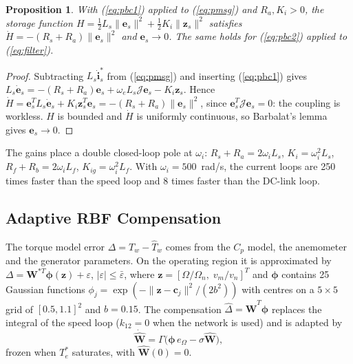 \documentclass[11pt,a4paper]{article}
\newtheorem{proposition}{Proposition}
\newcommand{\bv}[1]{\mathbf{#1}}
\newcommand{\Jm}{\boldsymbol{\mathcal{J}}}
\begin{document}
\begin{proposition}
With (\ref{eq:pbc1}) applied to (\ref{eq:pmsg}) and $R_a,K_i>0$, the storage function
$H=\frac12L_s\|\bv{e}_s\|^2+\frac12K_i\|\bv{z}_s\|^2$ satisfies $\dot H=-(R_s+R_a)\|\bv{e}_s\|^2$ and
$\bv{e}_s\to0$. The same holds for (\ref{eq:pbc2}) applied to (\ref{eq:filter}).
\end{proposition}
\begin{proof}
Subtracting $L_s\dot{\bv{i}}_s^*$ from (\ref{eq:pmsg}) and inserting (\ref{eq:pbc1}) gives
$L_s\dot{\bv{e}}_s=-(R_s+R_a)\bv{e}_s+\omega_eL_s\Jm\bv{e}_s-K_i\bv{z}_s$. Hence
$\dot H=\bv{e}_s^TL_s\dot{\bv{e}}_s+K_i\bv{z}_s^T\bv{e}_s=-(R_s+R_a)\|\bv{e}_s\|^2$, since
$\bv{e}_s^T\Jm\bv{e}_s=0$: the coupling is workless. $H$ is bounded and $\dot H$ is uniformly
continuous, so Barbalat's lemma~\cite{khalil2002} gives $\bv{e}_s\to0$.
\end{proof}
The gains place a double closed-loop pole at $\omega_i$: $R_s+R_a=2\omega_iL_s$, $K_i=\omega_i^2L_s$,
$R_f+R_b=2\omega_iL_f$, $K_{ig}=\omega_i^2L_f$. With $\omega_i=500$~rad/s, the current loops are 250 times
faster than the speed loop and 8 times faster than the DC-link loop.

\subsection{Adaptive RBF Compensation}
The torque model error $\Delta=T_w-\hat T_w$ comes from the $C_p$ model, the anemometer and the
generator parameters. On the operating region it is approximated by
$\Delta=\bv{W}^{*T}\boldsymbol\phi(\bv{z})+\varepsilon$, $|\varepsilon|\le\bar\varepsilon$, where
$\bv{z}=[\Omega/\Omega_n,\;v_m/v_n]^T$ and $\boldsymbol\phi$ contains 25 Gaussian functions
$\phi_j=\exp(-\|\bv{z}-\bv{c}_j\|^2/(2b^2))$ with centres on a $5\times5$ grid of
$[0.5,1.1]^2$ and $b=0.15$. The compensation $\hat\Delta=\hat{\bv{W}}^T\boldsymbol\phi$ replaces the
integral of the speed loop ($k_{12}=0$ when the network is used) and is adapted by
\begin{equation}
\dot{\hat{\bv{W}}} = \Gamma\bigl(\boldsymbol\phi\,e_\Omega - \sigma\hat{\bv{W}}\bigr),
\label{eq:law}
\end{equation}
frozen when $T_e^*$ saturates, with $\hat{\bv{W}}(0)=0$.
\end{document}
